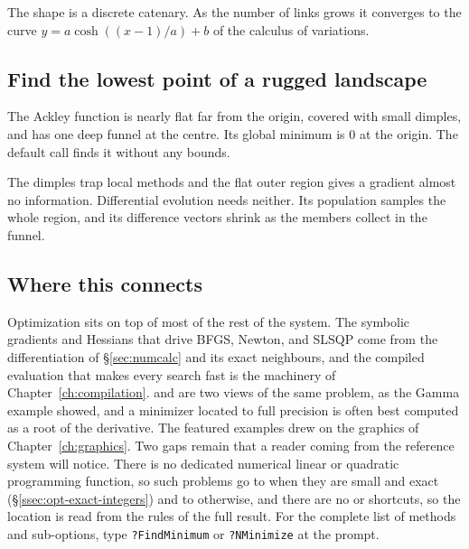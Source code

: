 
The shape is a discrete catenary. As the number of links grows it converges to
the curve \(y = a\cosh((x - 1)/a) + b\) of the calculus of variations.

\subsection*{Find the lowest point of a rugged landscape}

The Ackley function is nearly flat far from the origin, covered with small
dimples, and has one deep funnel at the centre. Its global minimum is \(0\) at
the origin. The default call finds it without any bounds.


The dimples trap local methods and the flat outer region gives a gradient
almost no information. Differential evolution needs neither. Its population
samples the whole region, and its difference vectors shrink as the members
collect in the funnel.

\subsection*{Where this connects}

Optimization sits on top of most of the rest of the system. The symbolic
gradients and Hessians that drive BFGS, Newton, and SLSQP come from the
differentiation of \S\ref{sec:numcalc} and its exact neighbours, and the
compiled evaluation that makes every search fast is the machinery of
Chapter~\ref{ch:compilation}.  and  are two views of
the same problem, as the Gamma example showed, and a minimizer located to full
precision is often best computed as a root of the derivative. The featured
examples drew on the graphics of Chapter~\ref{ch:graphics}. Two gaps remain
that a reader coming from the reference system will notice. There is no
dedicated numerical linear or quadratic programming function, so such problems go
to  when they are small and exact
(\S\ref{ssec:opt-exact-integers}) and to  otherwise, and there
are no  or  shortcuts,
so the location is read from the rules of the full result. For the complete
list of methods and sub-options, type \texttt{?FindMinimum} or
\texttt{?NMinimize} at the prompt.
